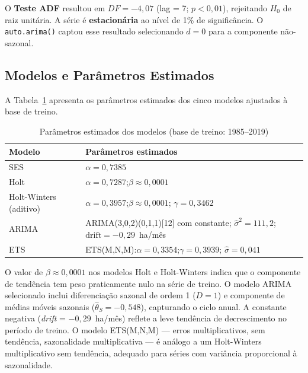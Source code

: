 \documentclass[12pt, a4paper]{article}
\begin{document}
O \textbf{Teste ADF} resultou em $DF = -4{,}07$ (lag = 7; $p < 0{,}01$),
rejeitando $H_0$ de raiz unitária. A série é \textbf{estacionária} ao nível de
1\% de significância. O \texttt{auto.arima()} captou esse resultado selecionando
$d = 0$ para a componente não-sazonal.

\subsection{Modelos e Parâmetros Estimados}

A Tabela~\ref{tab:params} apresenta os parâmetros estimados dos cinco modelos
ajustados à base de treino.

\begin{table}[H]
  \centering
  \caption{Parâmetros estimados dos modelos (base de treino: 1985--2019)}
  \label{tab:params}
  \begin{tabular}{lp{9.5cm}}
    \toprule
    \textbf{Modelo} & \textbf{Parâmetros estimados} \\
    \midrule
    SES
      & $\alpha = 0{,}7385$ \\[2pt]
    Holt
      & $\alpha = 0{,}7287$;\quad $\beta \approx 0{,}0001$ \\[2pt]
    Holt-Winters (aditivo)
      & $\alpha = 0{,}3957$;\quad $\beta \approx 0{,}0001$;\quad
        $\gamma = 0{,}3462$ \\[2pt]
    ARIMA
      & ARIMA(3,0,2)(0,1,1)[12] com constante;
        $\hat{\sigma}^2 = 111{,}2$;\quad $\text{drift} = -0{,}29$~ha/mês \\[2pt]
    ETS
      & ETS(M,N,M):\quad $\alpha = 0{,}3354$;\quad $\gamma = 0{,}3939$;\quad
        $\hat{\sigma} = 0{,}041$ \\
    \bottomrule
  \end{tabular}
\end{table}

O valor de $\beta \approx 0{,}0001$ nos modelos Holt e Holt-Winters indica
que o componente de tendência tem peso praticamente nulo na série de treino.
O modelo ARIMA selecionado inclui diferenciação sazonal de ordem 1 ($D = 1$)
e componente de médias móveis sazonais ($\hat{\theta}_S = -0{,}548$),
capturando o ciclo anual. A constante negativa (\textit{drift} = $-0{,}29$~ha/mês)
reflete a leve tendência de decrescimento no período de treino. O modelo
ETS(M,N,M) --- erros multiplicativos, sem tendência, sazonalidade multiplicativa
--- é análogo a um Holt-Winters multiplicativo sem tendência, adequado para
séries com variância proporcional à sazonalidade.
\end{document}
